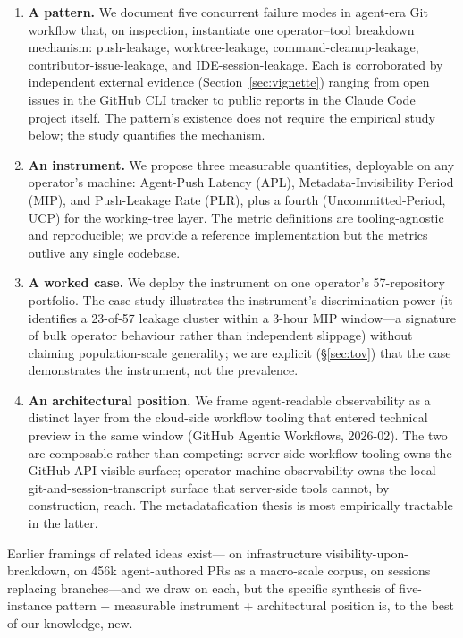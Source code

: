 \documentclass[sigconf, nonacm, anonymous=false]{acmart}
\begin{document}
\begin{enumerate}
  \item \textbf{A pattern.} We document five concurrent failure modes in agent-era Git workflow that, on inspection, instantiate one operator--tool breakdown mechanism: push-leakage, worktree-leakage, command-cleanup-leakage, contributor-issue-leakage, and IDE-session-leakage. Each is corroborated by independent external evidence (Section~\ref{sec:vignette}) ranging from open issues in the GitHub CLI tracker to public reports in the Claude Code project itself. The pattern's existence does not require the empirical study below; the study quantifies the mechanism.
  \item \textbf{An instrument.} We propose three measurable quantities, deployable on any operator's machine: Agent-Push Latency (APL), Metadata-Invisibility Period (MIP), and Push-Leakage Rate (PLR), plus a fourth (Uncommitted-Period, UCP) for the working-tree layer. The metric definitions are tooling-agnostic and reproducible; we provide a reference implementation but the metrics outlive any single codebase.
  \item \textbf{A worked case.} We deploy the instrument on one operator's 57-repository portfolio. The case study illustrates the instrument's discrimination power (it identifies a 23-of-57 leakage cluster within a 3-hour MIP window---a signature of bulk operator behaviour rather than independent slippage) without claiming population-scale generality; we are explicit (\S\ref{sec:tov}) that the case demonstrates the instrument, not the prevalence.
  \item \textbf{An architectural position.} We frame agent-readable observability as a distinct layer from the cloud-side workflow tooling that entered technical preview in the same window (GitHub Agentic Workflows, 2026-02). The two are composable rather than competing: server-side workflow tooling owns the GitHub-API-visible surface; operator-machine observability owns the local-git-and-session-transcript surface that server-side tools cannot, by construction, reach. The metadatafication thesis is most empirically tractable in the latter.
\end{enumerate}

Earlier framings of related ideas exist---\citet{star1996steps} on infrastructure visibility-upon-breakdown, \citet{li2025rise} on 456k agent-authored PRs as a macro-scale corpus, \citet{pinera2026rethinking} on sessions replacing branches---and we draw on each, but the specific synthesis of five-instance pattern + measurable instrument + architectural position is, to the best of our knowledge, new.
\end{document}
